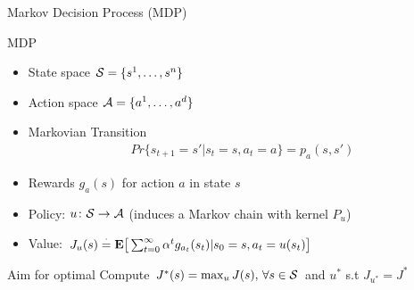 \documentclass[10pt,handout]{beamer}
\begin{document}
\begin{frame}[fragile]{Markov Decision Process (MDP)}
\begin{block}{MDP}
\begin{itemize}
\item State space $\S=\{s^1,\ldots,s^n\}$
\item Action space $\A=\{a^1,\ldots,a^d\}$
\item Markovian Transition
\begin{align*}
Pr\{s_{t+1}=s'| s_t=s, a_t=a\}=p_a(s,s')
\end{align*}
\item Rewards $g_a(s)$ for action $a$ in state $s$
\item Policy: $u\colon \S\ra \A$ (induces a Markov chain with kernel $P_u$)
\item Value: $J_u(s)\eqdef \E\big[\sum_{t=0}^\infty \alpha^t g_{a_t}(s_t)|s_0=s,a_t=u(s_t)\big]$
\end{itemize}
\end{block}
\begin{block}{Aim for optimal}
Compute  $J^*(s)=\max_{u} J(s),\,\forall s\in \S$ and $u^*$ s.t $J_{u^*}=J^*$
\end{block}
\end{frame}
\end{document}
